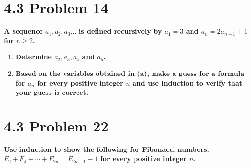 \documentclass[10pt]{article}
\begin{document}
\section{4.3 Problem 14}
\textbf{A sequence $a_1,a_2,a_3...$ is defined recursively by $a_1 = 3$ and $a_n = 2a_{n-1} + 1$ for $n \geq 2$.}

\begin{enumerate}[label=(\alph*)]

    \item \textbf{Determine $a_2, a_3, a_4$ and $a_5$.}

    \item \textbf{Based on the variables obtained in (a), make a guess for a formula for $a_n$ for every positive integer $n$ and use induction to verify that your guess is correct.}

\end{enumerate}



\section{4.3 Problem 22}
\textbf{Use induction to show the following for Fibonacci numbers: $F_2 + F_4 + \cdots + F_{2n} = F_{2n+1} - 1$ for every positive integer $n$.}
\end{document}
